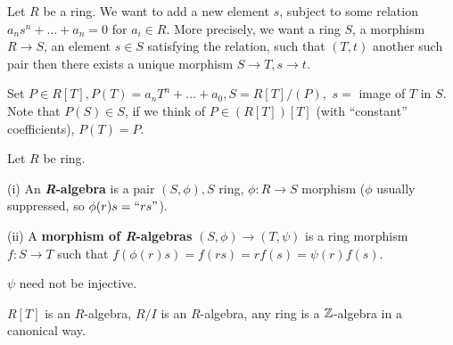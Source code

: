 Let $R$ be a ring. We want to add a new element $s$, subject to some relation $a_ns^n+\ldots+a_n=0$ for $a_i\in R$. More precisely, we want a ring $S$, a morphism $R\longrightarrow S$, an element $s\in S$ satisfying the relation, such that $(T,t)$ another such pair then there exists a unique morphism $S\longrightarrow T,s\longrightarrow t$.

Set $P\in R[T], P(T)=a_nT^n+\ldots+a_0, S=R[T]/(P),$ $s=$ image of $T$ in $S$. Note that $P(S)\in S$, if we think of $P\in (R[T])[T]$ (with ``constant'' coefficients), $P(T)=P.$
\begin{defn}\label{Defn 5, Jan 25}
Let $R$ be ring.

(i) An \textbf{\textit{R}-algebra} is a pair $(S,\phi), S$ ring, $\phi:R\longrightarrow S$ morphism ($\phi$ usually suppressed, so $\phi(r)s=``rs"$).

(ii) A \textbf{morphism of \textit{R}-algebras} $(S,\phi)\longrightarrow (T,\psi)$ is a ring morphism $f:S\longrightarrow T$ such that $f(\phi(r)s)=f(rs)=rf(s)=\psi(r)f(s)$.
\end{defn}
\begin{rmk}
$\psi$ need not be injective.
\end{rmk}
\begin{ex}
$R[T]$ is an $R$-algebra, $R/I$ is an $R$-algebra, any ring is a $\mathbb{Z}$-algebra in a canonical way.
\end{ex}
